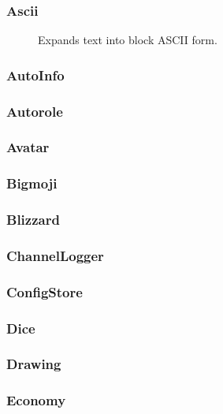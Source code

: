 \subsubsection{Ascii}
\begin{description}
	\item[]\label{com:ascii}
		Expands text into block ASCII form.
\end{description}

\subsubsection{AutoInfo}

\subsubsection{Autorole}

\subsubsection{Avatar}

\subsubsection{Bigmoji}

\subsubsection{Blizzard}

\subsubsection{ChannelLogger}

\subsubsection{ConfigStore}

\subsubsection{Dice}

\subsubsection{Drawing}

\subsubsection{Economy}

